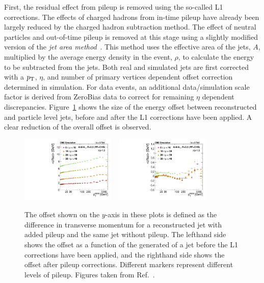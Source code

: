 First, the residual effect from pileup is removed using the so-called L1 corrections. The effects
of charged hadrons from in-time pileup have already been largely reduced by the charged hadron
subtraction method. The effect of neutral particles and out-of-time pileup is removed at this stage
using a slightly modified version of the \textit{jet area method}~\cite{Fastjet1,Fastjet2}.
This method uses the effective area of the jets, $A$, multiplied by the average energy density
in the event, $\rho$, to calculate the energy to be subtracted from the jets.
Both real and simulated jets are first corrected with a $p_{\mathrm{T}}$, $\eta$, and number of primary
vertices dependent offset correction determined in simulation. For data events, an additional
data/simulation scale factor is derived from ZeroBias data to correct for remaining $\eta$ dependent
discrepancies.
Figure~\ref{fig:JEC_L1} shows the size of the energy offset between reconstructed and particle level
jets, before and after the L1 corrections have been applied. A clear reduction of the overall offset
is observed. 

\begin{figure}[tpb]
  \centering
  \includegraphics[width=0.4\textwidth]{figures/eventreco_objects/OffMeantnpuRef_BB_ak5pfchs}
  ~
  \includegraphics[width=0.4\textwidth]{figures/eventreco_objects/OffMeantnpuRef_BB_ak5pfchsl1}
  \caption{The offset shown on the $y$-axis in these plots is defined as the difference in
transverse momentum for a reconstructed jet with added pileup and the same jet without pileup.
The lefthand side shows the offset as a function of the generated \pt of a jet before the L1
corrections have been applied, and the righthand side shows the offset after pileup
corrections. Different markers represent different levels of pileup. Figures taken from
Ref.~\cite{JEC_plots}.
  \label{fig:JEC_L1}}
\end{figure}



